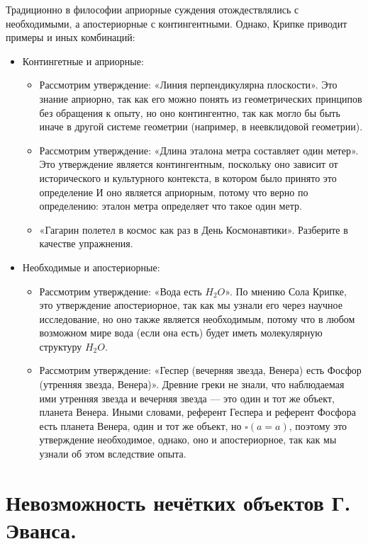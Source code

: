 \documentclass[openany]{book}
\theoremstyle{plain}
\theoremstyle{definition}
\begin{document}
Традиционно в философии априорные суждения отождествлялись с необходимыми, а апостериорные с контингентными.
Однако, Крипке приводит примеры и иных комбинаций:
\begin{itemize}
    \item Контингетные и априорные:
	\begin{itemize}
	    \item Рассмотрим утверждение: «Линия перпендикулярна плоскости». Это знание априорно, так как его можно понять из геометрических принципов без обращения к опыту, но оно контингентно, так как могло бы быть иначе в другой системе геометрии (например, в неевклидовой геометрии).
	    \item Рассмотрим утверждение: «Длина эталона метра составляет один метер». Это утверждение является контингентным, поскольку оно зависит от исторического и культурного контекста, в котором было принято это определение И оно является априорным, потому что верно по определению: эталон метра определяет что такое один метр.
	    \item «Гагарин полетел в космос как раз в День Космонавтики». Разберите в качестве упражнения.
	\end{itemize}
    \item Необходимые и апостериорные:
	\begin{itemize}
	    \item Рассмотрим утверждение: «Вода есть \(H_2 O\)». По мнению Сола Крипке, это утверждение апостериорное, так как мы узнали его через научное исследование, но оно также является необходимым, потому что в любом возможном мире вода (если она есть) будет иметь молекулярную структуру \(H_2 O\).
	    \item Рассмотрим утверждение: «Геспер (вечерняя звезда, Венера) есть Фосфор (утренняя звезда, Венера)». Древние греки не знали, что наблюдаемая ими утренняя звезда и вечерняя звезда — это один и тот же объект, планета Венера. Иными словами, референт Геспера и референт Фосфора есть планета Венера, один и тот же объект, но \(\square(a = a)\), поэтому это утверждение необходимое, однако, оно и апостериорное, так как мы узнали об этом вследствие опыта.
	\end{itemize}
\end{itemize}


\section{Невозможность нечётких объектов Г. Эванса.}
\end{document}
